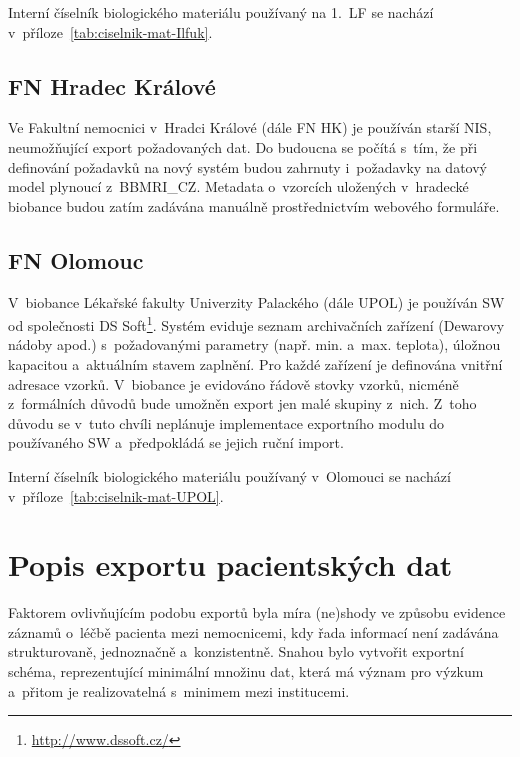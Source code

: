 \documentclass[11pt, final, oneside]{fithesis2}
\newcommand{\ProjectName}{\mbox{BBMRI\_CZ}\xspace}
\begin{document}
Interní číselník biologického materiálu používaný na 1.~LF se nachází v~příloze~\ref{tab:ciselnik-mat-Ilfuk}.

\subsection{FN Hradec Králové}
Ve Fakultní nemocnici v~Hradci Králové (dále FN HK) je používán starší NIS, neumožňující export požadovaných dat. Do budoucna se počítá s~tím, že při definování požadavků na nový systém budou zahrnuty i~požadavky na datový model plynoucí z~\ProjectName. Metadata o~vzorcích uložených v~hradecké biobance budou zatím zadávána manuálně prostřednictvím webového formuláře.

\subsection{FN Olomouc}
V~biobance Lékařské fakulty Univerzity Palackého (dále UPOL) je používán SW od společnosti DS Soft\footnote{\url{http://www.dssoft.cz/}}. Systém eviduje seznam archivačních zařízení (Dewarovy nádoby apod.) s~požadovanými parametry (např. min. a~max. teplota), úložnou kapacitou a~aktuálním stavem zaplnění. Pro každé zařízení je definována vnitřní adresace vzorků.
V~biobance je evidováno řádově stovky vzorků, nicméně z~formálních důvodů bude umožněn export jen malé skupiny z~nich. Z~toho důvodu se v~tuto chvíli neplánuje implementace exportního modulu do používaného SW a~předpokládá se jejich ruční import.

Interní číselník biologického materiálu používaný v~Olomouci se nachází v~příloze~\ref{tab:ciselnik-mat-UPOL}.


\section{Popis exportu pacientských dat}

Faktorem ovlivňujícím podobu exportů byla míra (ne)shody ve způsobu evidence záznamů o~léčbě pacienta mezi nemocnicemi, kdy řada informací není zadávána strukturovaně, jednoznačně a~konzistentně. Snahou bylo vytvořit exportní schéma, reprezentující minimální množinu dat, která má význam pro výzkum a~přitom je realizovatelná s~minimem  mezi institucemi.
\end{document}
